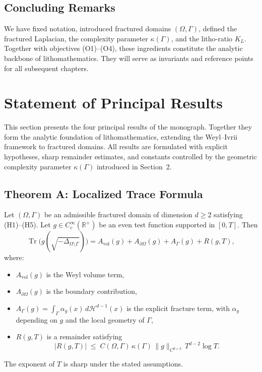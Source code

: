 \subsection{Concluding Remarks}

We have fixed notation, introduced fractured domains $(\Omega,\Gamma)$,
defined the fractured Laplacian, the complexity parameter $\kappa(\Gamma)$,
and the litho-ratio $K_L$. Together with objectives (O1)--(O4), these
ingredients constitute the analytic backbone of lithomathematics.
They will serve as invariants and reference points for all subsequent
chapters.


\section{Statement of Principal Results}

This section presents the four principal results of the monograph. Together
they form the analytic foundation of lithomathematics, extending the Weyl–Ivrii
framework to fractured domains. All results are formulated with explicit
hypotheses, sharp remainder estimates, and constants controlled by the
geometric complexity parameter $\kappa(\Gamma)$ introduced in Section~2.

\subsection{Theorem A: Localized Trace Formula}

\begin{theoremA}
Let $(\Omega,\Gamma)$ be an admissible fractured domain of dimension $d\geq 2$
satisfying (H1)--(H5). Let $g\in C_c^\infty(\mathbb{R}^+)$ be an even test
function supported in $[0,T]$. Then
\[
\operatorname{Tr}\!\bigl(g(\sqrt{-\Delta_{\Omega\setminus\Gamma}})\bigr)
= A_{\mathrm{vol}}(g) + A_{\partial\Omega}(g) + A_\Gamma(g) + R(g,T),
\]
where:
\begin{itemize}
  \item $A_{\mathrm{vol}}(g)$ is the Weyl volume term,
  \item $A_{\partial\Omega}(g)$ is the boundary contribution,
  \item $A_\Gamma(g) = \int_\Gamma \alpha_g(x)\,d\mathcal{H}^{d-1}(x)$ is the
  explicit fracture term, with $\alpha_g$ depending on $g$ and the local
  geometry of $\Gamma$,
  \item $R(g,T)$ is a remainder satisfying
  \[
  |R(g,T)| \;\leq\; C(\Omega,\Gamma)\,\kappa(\Gamma)\,
  \|g\|_{C^{d+3}}\,T^{d-2}\log T .
  \]
\end{itemize}
The exponent of $T$ is sharp under the stated assumptions.
\end{theoremA}

